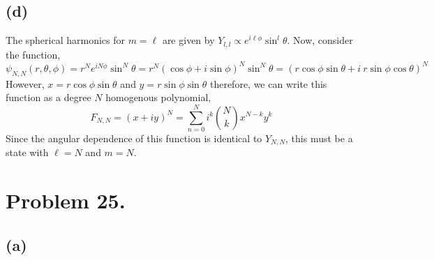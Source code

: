 \documentclass[12pt]{extarticle}
\begin{document}
\subsection*{(d)}

The spherical harmonics for $m = \ell$ are given by $Y_{l,l} \propto e^{i \ell \phi} \sin^l{\theta}$. Now, consider the function, 
\[\psi_{N,N}(r, \theta, \phi) = r^N e^{i N \phi} \sin^N{\theta} = r^N(\cos{\phi} + i \sin{\phi})^N \sin^N {\theta} = (r \cos{\phi} \sin{\theta} + i \: r \sin{\phi} \cos{\theta} )^N\]
However, $x = r \cos{\phi} \sin{\theta}$ and $y = r \sin{\phi} \sin{\theta}$ therefore, we can write this function as a degree $N$ homogenous polynomial,
\[F_{N,N} = (x + iy)^N = \sum_{n = 0}^N i^k \binom{N}{k} x^{N - k} y^k \]
Since the angular dependence of this function is identical to $Y_{N,N}$, this must be a state with $\ell = N$ and $m = N$. 

\section*{Problem 25.}

\subsection*{(a)}
\end{document}
